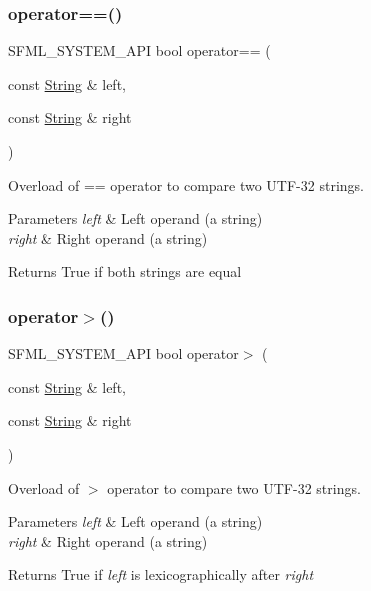 \subsubsection{\texorpdfstring{operator==()}{operator==()}}
{\footnotesize\ttfamily S\+F\+M\+L\+\_\+\+S\+Y\+S\+T\+E\+M\+\_\+\+A\+PI bool operator== (\begin{DoxyParamCaption}\item[{const \hyperlink{classsf_1_1_string}{String} \&}]{left,  }\item[{const \hyperlink{classsf_1_1_string}{String} \&}]{right }\end{DoxyParamCaption})\hspace{0.3cm}{\ttfamily [related]}}



Overload of == operator to compare two U\+T\+F-\/32 strings. 


\begin{DoxyParams}{Parameters}
{\em left} & Left operand (a string) \\
\hline
{\em right} & Right operand (a string)\\
\hline
\end{DoxyParams}
\begin{DoxyReturn}{Returns}
True if both strings are equal 
\end{DoxyReturn}
\mbox{\label{classsf_1_1_string_a5efc1eca58cf5c17d01eb8501d303538}} 
\subsubsection{\texorpdfstring{operator$>$()}{operator>()}}
{\footnotesize\ttfamily S\+F\+M\+L\+\_\+\+S\+Y\+S\+T\+E\+M\+\_\+\+A\+PI bool operator$>$ (\begin{DoxyParamCaption}\item[{const \hyperlink{classsf_1_1_string}{String} \&}]{left,  }\item[{const \hyperlink{classsf_1_1_string}{String} \&}]{right }\end{DoxyParamCaption})\hspace{0.3cm}{\ttfamily [related]}}



Overload of $>$ operator to compare two U\+T\+F-\/32 strings. 


\begin{DoxyParams}{Parameters}
{\em left} & Left operand (a string) \\
\hline
{\em right} & Right operand (a string)\\
\hline
\end{DoxyParams}
\begin{DoxyReturn}{Returns}
True if {\itshape left} is lexicographically after {\itshape right} 
\end{DoxyReturn}
\mbox{\label{classsf_1_1_string_a8d2979d7829d6616330a768956f251e1}} 
